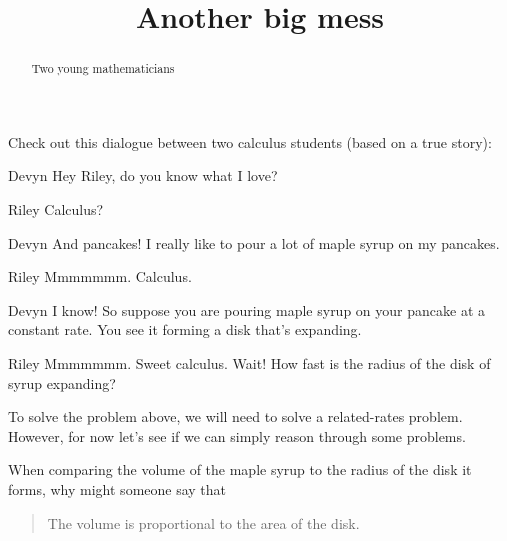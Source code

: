 \documentclass{ximera}
\title[Break-Ground:]{Another big mess}
\begin{document}
\begin{abstract}
Two young mathematicians 
\end{abstract}
\maketitle

Check out this dialogue between two calculus students (based on a true
story):


\begin{dialogue}
\item[Devyn] Hey Riley, do you know what I love?
\item[Riley] Calculus? 
\item[Devyn] And pancakes! I really like to pour a lot of maple syrup
  on my pancakes.
\item[Riley] Mmmmmmm. Calculus. 
\item[Devyn] I know! So suppose you are pouring maple syrup on your
  pancake at a constant rate. You see it forming a disk that's expanding.
\item[Riley] Mmmmmmm. Sweet calculus. Wait! How fast is the radius of
  the disk of syrup expanding?
\end{dialogue}

To solve the problem above, we will need to solve a related-rates
problem. However, for now let's see if we can simply reason through
some problems.

\begin{problem}
  When comparing the volume of the maple syrup to the radius of the
  disk it forms, why might someone say that
  \begin{quote}
    The volume is proportional to the area of the disk.
  \end{quote}
  \begin{multipleChoice}
  \end{multipleChoice}
\end{problem}


\end{document}
